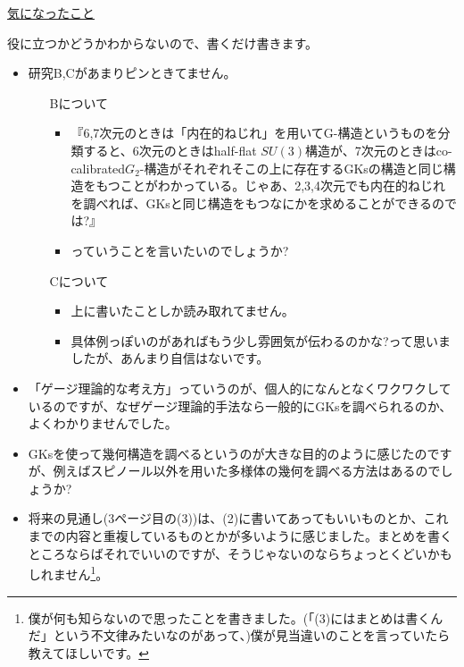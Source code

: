 \documentclass[unicode,a4paper,10pt]{ltjsarticle}
\theoremstyle{definition}
\renewcommand{\theequation}{$\thesection.\arabic{equation}$}
\renewcommand{\thefigure}{\thesection.\arabic{figure}}
\renewcommand{\thetable}{\thesection.\arabic{table}}
\begin{document}
\uline{気になったこと}

役に立つかどうかわからないので、書くだけ書きます。

\begin{itemize}
  \item 
  研究B,Cがあまりピンときてません。
  \begin{itemize}
    \item [Bについて]
    \begin{itemize}
      \item 
      『6,7次元のときは「内在的ねじれ」を用いてG-構造というものを分類すると、6次元のときはhalf-flat $SU(3)$構造が、7次元のときはco-calibrated$G_{2}$-構造がそれぞれそこの上に存在するGKsの構造と同じ構造をもつことがわかっている。じゃあ、2,3,4次元でも内在的ねじれを調べれば、GKsと同じ構造をもつなにかを求めることができるのでは?』
      \item 
      っていうことを言いたいのでしょうか?
    \end{itemize}
    \item [Cについて]
    \begin{itemize}
      \item 
      上に書いたことしか読み取れてません。
      \item 
      具体例っぽいのがあればもう少し雰囲気が伝わるのかな?って思いましたが、あんまり自信はないです。
    \end{itemize}
  \end{itemize}
  \item 
  「ゲージ理論的な考え方」っていうのが、個人的になんとなくワクワクしているのですが、なぜゲージ理論的手法なら一般的にGKsを調べられるのか、よくわかりませんでした。
  \item 
  GKsを使って幾何構造を調べるというのが大きな目的のように感じたのですが、例えばスピノール以外を用いた多様体の幾何を調べる方法はあるのでしょうか?
  \item 
  将来の見通し(3ページ目の(3))は、(2)に書いてあってもいいものとか、これまでの内容と重複しているものとかが多いように感じました。まとめを書くところならばそれでいいのですが、そうじゃないのならちょっとくどいかもしれません\footnote{
    僕が何も知らないので思ったことを書きました。(「(3)にはまとめは書くんだ」という不文律みたいなのがあって、)僕が見当違いのことを言っていたら教えてほしいです。
  }。
\end{itemize}





\end{document}
